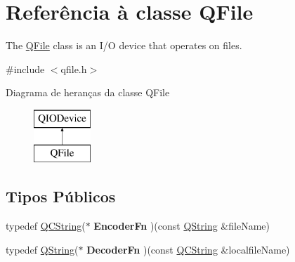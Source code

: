 \hypertarget{class_q_file}{\section{Referência à classe Q\-File}
\label{class_q_file}
}


The \hyperlink{class_q_file}{Q\-File} class is an I/\-O device that operates on files.  




{\ttfamily \#include $<$qfile.\-h$>$}

Diagrama de heranças da classe Q\-File\begin{figure}[H]
\begin{center}
\leavevmode
\includegraphics[height=2.000000cm]{class_q_file}
\end{center}
\end{figure}
\subsection*{Tipos Públicos}
\begin{DoxyCompactItemize}
\item 
\hypertarget{class_q_file_a13aacb62d43709d2b3bb28c4342dd835}{typedef \hyperlink{class_q_c_string}{Q\-C\-String}($\ast$ {\bfseries Encoder\-Fn} )(const \hyperlink{class_q_string}{Q\-String} \&file\-Name)}\label{class_q_file_a13aacb62d43709d2b3bb28c4342dd835}

\item 
\hypertarget{class_q_file_a648e538c38cc1cae4521f7fc94b13e1e}{typedef \hyperlink{class_q_string}{Q\-String}($\ast$ {\bfseries Decoder\-Fn} )(const \hyperlink{class_q_c_string}{Q\-C\-String} \&localfile\-Name)}\label{class_q_file_a648e538c38cc1cae4521f7fc94b13e1e}

\end{DoxyCompactItemize}
